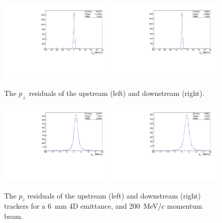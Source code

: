   
  \begin{figure}[p]
    \begin{center}
      \includegraphics[width=0.49\textwidth, angle=0]{08-Performance/upstream_pt_residudal.pdf}
      \includegraphics[width=0.49\textwidth, angle=0]{08-Performance/downstream_pt_residudal.pdf}
      \caption{\label{fig:PtResidKalman} The $p_{\perp}$ residuals of the upstream (left) and downstream (right).}
    \end{center}
  \end{figure}
  
   \begin{figure}[p]
    \begin{center}
      \includegraphics[width=0.49\textwidth, angle=0]{08-Performance/upstream_pz_residudal.pdf}
      \includegraphics[width=0.49\textwidth, angle=0]{08-Performance/downstream_pz_residudal.pdf}
      \caption{\label{fig:PzResidKalman} The $p_z$ residuals of the upstream (left) and downstream (right) trackers for a 6~mm 4D emittance, and 200~MeV/c momentum beam.}
    \end{center}
  \end{figure}
  
